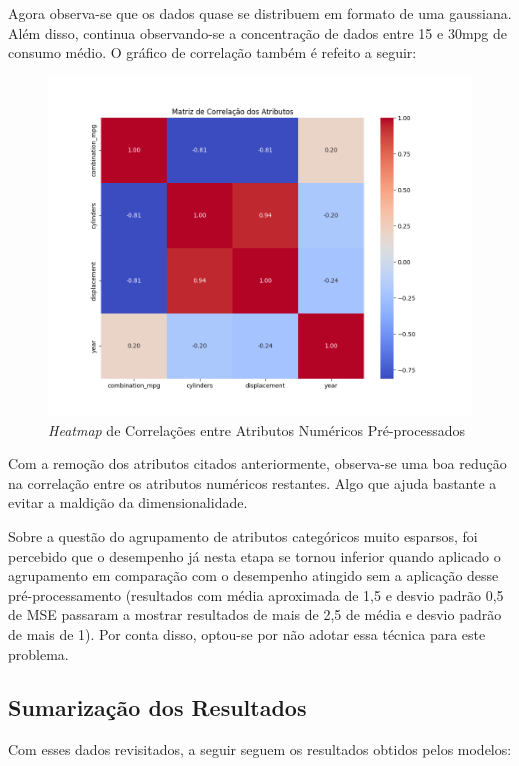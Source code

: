 \documentclass{report}
\begin{document}
Agora observa-se que os dados quase se distribuem em formato de uma gaussiana. Além disso, continua observando-se a concentração de dados entre 15 e 30mpg de consumo médio. O gráfico de correlação também é refeito a seguir:

\begin{figure}[h!]
  \centering
  \includegraphics[width=.85\linewidth]{images/plots/heatmaps/no_outliers_numeric_atributes_correlation.png}
  \caption{\label{img:pre_num_heatmat} \textit{Heatmap} de Correlações entre Atributos Numéricos Pré-processados}
\end{figure}

Com a remoção dos atributos citados anteriormente, observa-se uma boa redução na correlação entre os atributos numéricos restantes. Algo que ajuda bastante a evitar a maldição da dimensionalidade.

Sobre a questão do agrupamento de atributos categóricos muito esparsos, foi percebido que o desempenho já nesta etapa se tornou inferior quando aplicado o agrupamento em comparação com o desempenho atingido
sem a aplicação desse pré-processamento (resultados com média aproximada de 1,5 e desvio padrão 0,5 de MSE passaram a mostrar resultados de mais de 2,5 de média e desvio padrão de mais de 1). Por conta disso,
optou-se por não adotar essa técnica para este problema.

\subsection{Sumarização dos Resultados}

Com esses dados revisitados, a seguir seguem os resultados obtidos pelos modelos:
\end{document}
